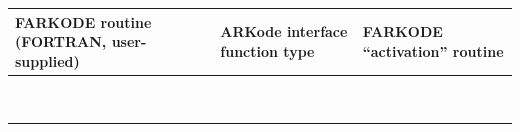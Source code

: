 \documentclass[letterpaper,10pt,english]{sphinxmanual}
\begin{document}
\begin{tabulary}{\linewidth}{|L|L|L|}
\hline
\textbf{
FARKODE routine
(FORTRAN, user-supplied)
} & \textbf{
ARKode interface
function type
} & \textbf{
FARKODE ``activation'' routine
}\\\hline

{\hyperref[f_interface/Usage:f/_/FARKDJAC]{}}
 & 
{\hyperref[c_interface/User_supplied:ARKDlsDenseJacFn]{}}
 & 
{\hyperref[f_interface/Usage:f/_/FARKDENSESETJAC]{}}
\\\hline

{\hyperref[f_interface/Usage:f/_/FARKBJAC]{}}
 & 
{\hyperref[c_interface/User_supplied:ARKDlsBandJacFn]{}}
 & 
{\hyperref[f_interface/Usage:f/_/FARKBANDSETJAC]{}}
\\\hline

{\hyperref[f_interface/Usage:f/_/FARKSPJAC]{}}
 & 
{\hyperref[c_interface/User_supplied:ARKSlsSparseJacFn]{}}
 & \\\hline

{\hyperref[f_interface/Usage:f/_/FARKPSET]{}}
 & 
{\hyperref[c_interface/User_supplied:ARKSpilsPrecSetupFn]{}}
 & 
{\hyperref[f_interface/Usage:f/_/FARKSPILSSETPREC]{}}
\\\hline

{\hyperref[f_interface/Usage:f/_/FARKPSOL]{}}
 & 
{\hyperref[c_interface/User_supplied:ARKSpilsPrecSolveFn]{}}
 & 
{\hyperref[f_interface/Usage:f/_/FARKSPILSSETPREC]{}}
\\\hline

{\hyperref[f_interface/Usage:f/_/FARKJTIMES]{}}
 & 
{\hyperref[c_interface/User_supplied:ARKSpilsJacTimesVecFn]{}}
 & 
{\hyperref[f_interface/Usage:f/_/FARKSPILSSETJAC]{}}
\\\hline

{\hyperref[f_interface/Usage:f/_/FARKEWT]{}}
 & 
{\hyperref[c_interface/User_supplied:ARKEwtFn]{}}
 & 
{\hyperref[f_interface/Usage:f/_/FARKEWTSET]{}}
\\\hline

{\hyperref[f_interface/Usage:f/_/FARKADAPT]{}}
 & 
{\hyperref[c_interface/User_supplied:ARKAdaptFn]{}}
 & 
{\hyperref[f_interface/Usage:f/_/FARKADAPTSET]{}}
\\\hline

{\hyperref[f_interface/Usage:f/_/FARKEXPSTAB]{}}
 & 
{\hyperref[c_interface/User_supplied:ARKExpStabFn]{}}
 & 
{\hyperref[f_interface/Usage:f/_/FARKEXPSTABSET]{}}
\\\hline
\end{tabulary}
\end{document}
